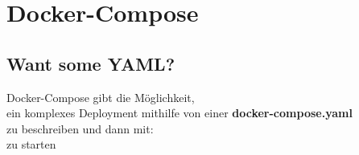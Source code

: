 \section{Docker-Compose}\label{sec:docker-compose}
\subsection{Want some YAML?}

\begin{frame}
    \slidehead
    \centering
    \Large
    Docker-Compose gibt die Möglichkeit, \\
    ein komplexes Deployment mithilfe von einer
    \textbf{docker-compose.yaml} \\
    zu beschreiben und dann mit: \\
    \normalsize
    \Large
    zu starten
\end{frame}

